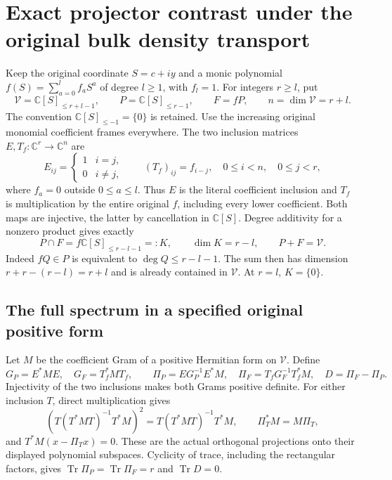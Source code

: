 \section{Exact projector contrast under the original bulk density transport}

Keep the original coordinate $S=c+iy$ and a monic polynomial
$f(S)=\sum_{a=0}^{l}f_aS^a$ of degree $l\geq1$, with $f_l=1$.
For integers $r\geq l$, put
\[
 \mathcal V=\mathbb C[S]_{\leq r+l-1},\qquad
 P=\mathbb C[S]_{\leq r-1},\qquad F=fP,
 \qquad n=\dim\mathcal V=r+l.
 \tag{CTI1}
\]
The convention $\mathbb C[S]_{\leq-1}=\{0\}$ is retained.
Use the increasing original monomial coefficient frames everywhere.
The two inclusion matrices $E,T_f:\mathbb C^r\to\mathbb C^n$ are
\[
 E_{ij}=\begin{cases}1&i=j,\\0&i\ne j,\end{cases}
 \qquad (T_f)_{ij}=f_{i-j},
 \quad 0\leq i<n,\quad0\leq j<r,
 \tag{CTI2}
\]
where $f_a=0$ outside $0\leq a\leq l$. Thus $E$ is the
literal coefficient inclusion and $T_f$ is multiplication by the
entire original $f$, including every lower coefficient.
Both maps are injective, the latter by cancellation in $\mathbb C[S]$.
Degree additivity for a nonzero product gives exactly
\[
 P\cap F=f\mathbb C[S]_{\leq r-l-1}=:K,\qquad
 \dim K=r-l,\qquad P+F=\mathcal V.
 \tag{CTI3}
\]
Indeed $fQ\in P$ is equivalent to $\deg Q\leq r-l-1$.
The sum then has dimension $r+r-(r-l)=r+l$ and is already
contained in $\mathcal V$. At $r=l$, $K=\{0\}$.

\subsection{The full spectrum in a specified original positive form}

Let $M$ be the coefficient Gram of a positive Hermitian form on
$\mathcal V$. Define
\[
 G_P=E^*ME,\quad G_F=T_f^*MT_f,\qquad
 \Pi_P=E G_P^{-1}E^*M,\quad
 \Pi_F=T_f G_F^{-1}T_f^*M,\quad D=\Pi_F-\Pi_P.
 \tag{CTI4}
\]
Injectivity of the two inclusions makes both Grams positive definite.
For either inclusion $T$, direct multiplication gives
\[
 (T(T^*MT)^{-1}T^*M)^2=T(T^*MT)^{-1}T^*M,
 \qquad \Pi_T^*M=M\Pi_T,
 \tag{CTI5}
\]
and $T^*M(x-\Pi_Tx)=0$. These are the actual orthogonal
projections onto their displayed polynomial subspaces. Cyclicity of
trace, including the rectangular factors, gives
$\operatorname{Tr}\Pi_P=\operatorname{Tr}\Pi_F=r$ and
$\operatorname{Tr}D=0$.

